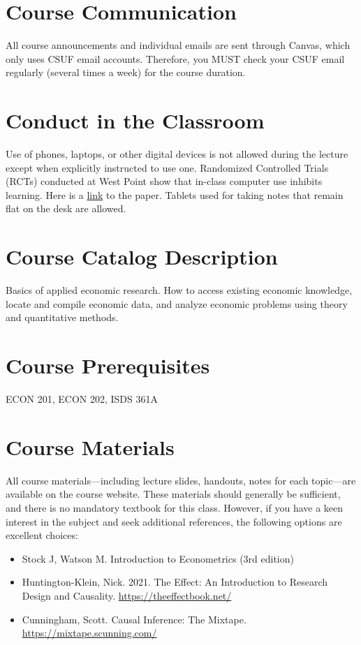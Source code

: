 \documentclass{syllabus}
\begin{document}
\section*{Course Communication}
All course announcements and individual emails are sent through Canvas, which only uses CSUF email accounts. Therefore, you MUST check your CSUF email regularly (several times a week) for the course duration.

\section*{Conduct in the Classroom}
Use of phones, laptops, or other digital devices is not allowed during the lecture except when explicitly instructed to use one. Randomized Controlled Trials (RCTs) conducted at West Point show that in-class computer use inhibits learning. Here is a \href{https://oema.army.mil/pub/2017_Carter_Greenberg_Walker_Computer_Usage_RCT_USMA.pdf}{link} to the paper. Tablets used for taking notes that remain flat on the desk are allowed.

\section*{Course Catalog Description}
Basics of applied economic research. How to access existing economic knowledge, locate and compile economic data, and analyze economic problems using theory and quantitative methods.

\section*{Course Prerequisites}
ECON 201, ECON 202, ISDS 361A

\section*{Course Materials}
All course materials---including lecture slides, handouts, notes for each topic—are available on the course website. These materials should generally be sufficient, and there is no mandatory textbook for this class. However, if you have a keen interest in the subject and seek additional references, the following options are excellent choices:

\begin{itemize}
\item Stock J, Watson M. Introduction to Econometrics (3rd edition) 
\item Huntington-Klein, Nick. 2021. The Effect: An Introduction to Research Design and Causality. \href{https://theeffectbook.net/}{https://theeffectbook.net/}
\item Cunningham, Scott. Causal Inference: The Mixtape. \href{https://mixtape.scunning.com/}{https://mixtape.scunning.com/}
\end{itemize}
\end{document}
